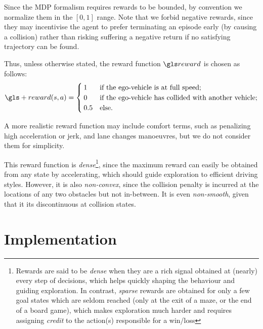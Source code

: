 Since the \gls{MDP} formalism requires rewards to be bounded, by convention we normalize them in the $[0, 1]$ range.
Note that we forbid negative rewards, since they may incentivise the agent to prefer terminating an episode early (by causing a collision) rather than risking suffering a negative return if no satisfying trajectory can be found.

Thus, unless otherwise stated, the reward function $\R$ is chosen as follows:
\begin{equation}
\label{eq:reward-function}
\gls+{reward}(s,a) = 
\begin{cases}
1 & \text{if the ego-vehicle is at full speed;}\\
0 & \text{if the ego-vehicle has collided with another vehicle;}\\
0.5 & \text{else.}
\end{cases}
\end{equation}

A more realistic reward function may include comfort terms, such as penalizing high acceleration or jerk, and lane changes manoeuvres, but we do not consider them for simplicity.

This reward function is \emph{dense}\footnote{Rewards are said to be \emph{dense} when they are a rich signal obtained at (nearly) every step of decisions, which helps quickly shaping the behaviour and guiding exploration. In contrast, \emph{sparse} rewards are obtained for only a few goal states which are seldom reached (\eg only at the exit of a maze, or the end of a board game), which makes exploration much harder and requires assigning \emph{credit} to the action(s) responsible for a win/loss}, since the maximum reward can easily be obtained from any state by accelerating, which should guide exploration to efficient driving styles. However, it is also \emph{non-convex}, since \eg the collision penalty is incurred at the locations of any two obstacles but not in-between. It is even \emph{non-smooth}, given that it its discontinuous at collision states.

\section{Implementation}

